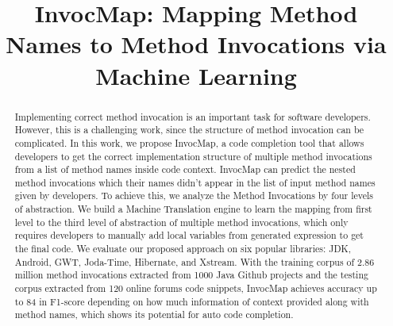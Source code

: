 \documentclass{article} %
\title{InvocMap: Mapping Method Names to Method Invocations via Machine Learning}
\begin{document}
\maketitle

\begin{abstract}
	Implementing correct  method invocation is an important task for software developers. However, this is a challenging work, since the structure of method invocation can be complicated. In this work, we propose InvocMap, a code completion tool that allows developers to get the correct implementation structure of multiple method invocations from a list of method names inside code context. InvocMap can predict the nested method invocations which their names didn't appear in the list of input method names given by developers. To achieve this, we analyze the Method Invocations by four levels of abstraction. We build a Machine Translation engine to learn the mapping from first level to the third level of abstraction of multiple method invocations, which only requires developers to manually add local variables from generated expression to get the final code. We evaluate our proposed approach on six popular libraries: JDK, Android, GWT, Joda-Time, Hibernate, and Xstream. With the training corpus of 2.86 million method invocations extracted from 1000 Java Github projects and the testing corpus extracted from 120 online forums code snippets, InvocMap  achieves accuracy up to 84 in F1-score depending on how much information of context provided along with method names, which shows its potential for auto code completion.    
\end{abstract}





\end{document}
